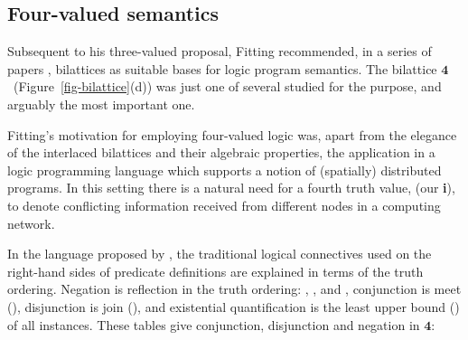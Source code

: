 \documentclass{tlp}
\newcommand{\Quad}{\ensuremath{\mathbf{4}}}
\begin{document}
\subsection{Four-valued semantics}
\label{sec-four}

Subsequent to his three-valued proposal, Fitting recommended,
in a series of papers 
\citeyear{fitting:Fund_Info_1988,fitting:LICS1989,fitting:JLC_1991,fitting:JLP_1991,fitting:TCS_2002},
bilattices as suitable bases for logic program semantics.
The bilattice \Quad\ (Figure~\ref{fig-bilattice}(d)) was just one of 
several studied for the purpose, and arguably the most important one.


Fitting's motivation for employing four-valued logic was, apart from
the elegance of the interlaced bilattices and their algebraic
properties, the application in a logic programming language which
supports a notion of (spatially) distributed programs. 
In this setting there is a natural need for a fourth truth value, 
(our \textbf{i}), to denote conflicting information received from
different nodes in a computing network.

In the language proposed by , 
the traditional logical connectives used on the 
right-hand sides of predicate definitions are explained in terms 
of the truth ordering.
Negation is reflection in the truth ordering: 
, , 
 and ,
conjunction is meet (), disjunction is join (), and 
existential quantification is the least upper bound () of 
all instances.
These tables give conjunction, disjunction and negation in \Quad:
\medskip
\end{document}
